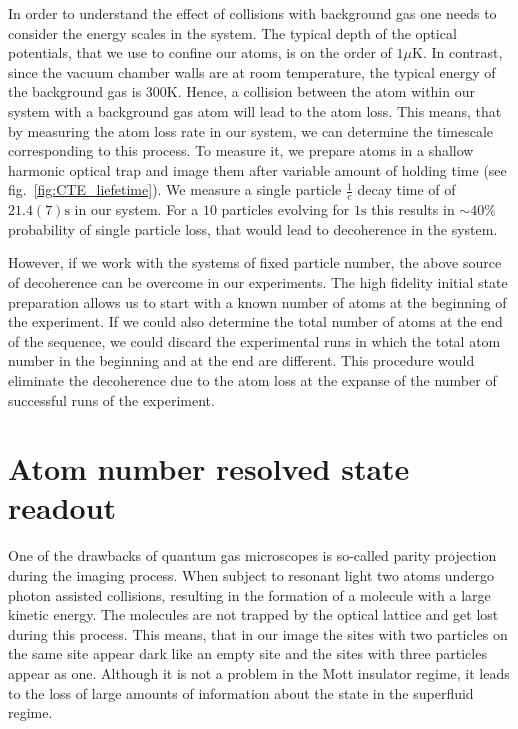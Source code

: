 In order to understand the effect of collisions with background gas one needs to consider the energy scales in the system. The typical depth of the optical potentials, that we use to confine our atoms, is on the order of $1 \mu \textrm{K}$. In contrast, since the vacuum chamber walls are at room temperature, the typical energy of the background gas is $300 \textrm{K}$. Hence, a collision between the atom within our system with a background gas atom will lead to the atom loss. This means, that by measuring the atom loss rate in our system, we can determine the timescale corresponding to this process. To measure it, we prepare atoms in a shallow harmonic optical trap and image them after variable amount of holding time (see fig.~\ref{fig:CTE_liefetime}). We measure a single particle $\frac{1}{e}$ decay time of of $21.4(7)\textrm{s}$ in our system. For a $10$ particles  evolving for $1\textrm{s}$ this results in $\sim 40\%$ probability of single particle loss, that would lead to decoherence in the system.

However, if we work with the systems of fixed particle number, the above source of decoherence can be overcome in our experiments. The high fidelity initial state preparation allows us to start with a known number of atoms at the beginning of the experiment. If we could also determine the total number of atoms at the end of the sequence, we could discard the experimental runs in which the total atom number in the beginning and at the end are different. This procedure would eliminate the decoherence due to the atom loss at the expanse of the number of successful runs of the experiment.

\section{Atom number resolved state readout}
One of the drawbacks of quantum gas microscopes is so-called parity projection during the imaging process. When subject to resonant light two atoms undergo photon assisted collisions, resulting in the formation of a molecule with a large kinetic energy. The molecules are not trapped by the optical lattice and get lost during this process. This means, that in our image the sites with two particles on the same site appear dark like an empty site and the sites with three particles appear as one. Although it is not a problem in the Mott insulator regime, it leads to the loss of large amounts of information about the state in the superfluid regime. 

